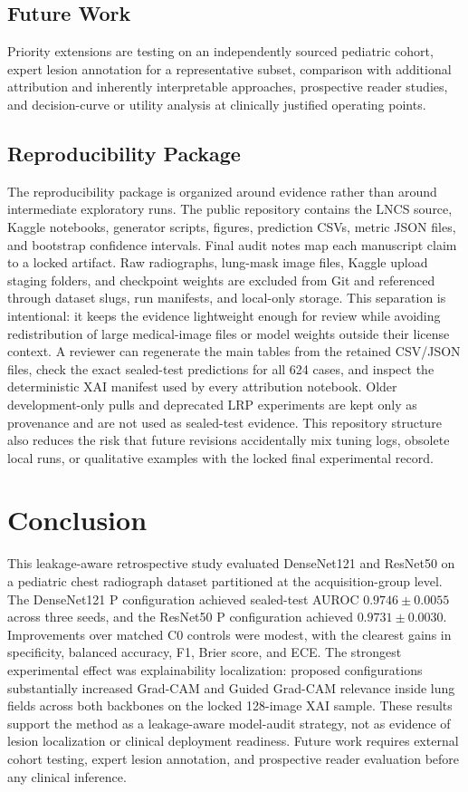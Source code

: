 \documentclass[runningheads]{llncs}
\begin{document}
\subsection{Future Work}

Priority extensions are testing on an independently sourced pediatric cohort,
expert lesion annotation for a representative subset, comparison with additional
attribution and inherently interpretable approaches, prospective reader studies,
and decision-curve or utility analysis at clinically justified operating points.

\subsection{Reproducibility Package}

The reproducibility package is organized around evidence rather than around
intermediate exploratory runs. The public repository contains the LNCS source,
Kaggle notebooks, generator scripts, figures, prediction CSVs, metric JSON files,
and bootstrap confidence intervals. Final audit notes map each manuscript claim
to a locked artifact. Raw radiographs, lung-mask image
files, Kaggle upload staging folders, and checkpoint weights are excluded from
Git and referenced through dataset slugs, run manifests, and local-only storage.
This separation is intentional: it keeps the evidence lightweight enough for
review while avoiding redistribution of large medical-image files or model
weights outside their license context. A reviewer can regenerate the main tables
from the retained CSV/JSON files, check the exact sealed-test predictions for all
624 cases, and inspect the deterministic XAI manifest used by every attribution
notebook. Older development-only pulls and deprecated LRP experiments are kept
only as provenance and are not used as sealed-test evidence. This repository
structure also reduces the risk that future revisions accidentally mix tuning
logs, obsolete local runs, or qualitative examples with the locked final
experimental record.

\section{Conclusion}

This leakage-aware retrospective study evaluated DenseNet121 and ResNet50 on a
pediatric chest radiograph dataset partitioned at the acquisition-group level.
The DenseNet121 P configuration achieved sealed-test AUROC
$0.9746 \pm 0.0055$ across three seeds, and the ResNet50 P configuration
achieved $0.9731 \pm 0.0030$. Improvements over matched C0 controls were
modest, with the clearest gains in specificity, balanced accuracy, F1, Brier
score, and ECE. The strongest experimental effect was explainability
localization: proposed configurations substantially increased Grad-CAM and
Guided Grad-CAM relevance inside lung fields across both backbones on the locked
128-image XAI sample. These results support the method as a leakage-aware
model-audit strategy, not as evidence of lesion localization or clinical
deployment readiness. Future work requires external cohort testing, expert
lesion annotation, and prospective reader evaluation before any clinical
inference.
\end{document}
